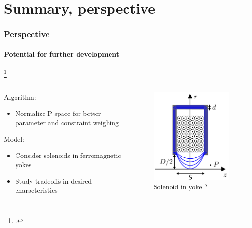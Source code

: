 \documentclass[10pt]{beamer}
\newcommand{\citesame}{$^{\thefootnote}$}
\newcommand{\rfn}{\setcounter{footnote}{0}}
\begin{document}
\section{Summary, perspective}

\begin{frame}
  \frametitle{Perspective}
  \framesubtitle{Potential for further development}
  \rfn
  \vspace{-10cm}
  \footcite{Disser}
  \vspace{10cm}
  \begin{columns}
    \begin{column}{0.7\textwidth}
      Algorithm:
      \begin{itemize}
        \item Normalize P-space for better parameter and constraint weighing
      \end{itemize}
      \vspace{0.5cm}
      Model:
      \begin{itemize}
        \item Consider solenoids in ferromagnetic yokes
        \vspace{0.5cm}
        \item Study tradeoffs in desired characteristics
      \end{itemize}
    \end{column}
    \begin{column}{0.3\textwidth}
        \begin{figure}
          \includegraphics[width=\textwidth]{yoke}
          \caption{Solenoid in yoke \citesame}
        \end{figure}
    \end{column}
  \end{columns}


\end{frame}
\end{document}

